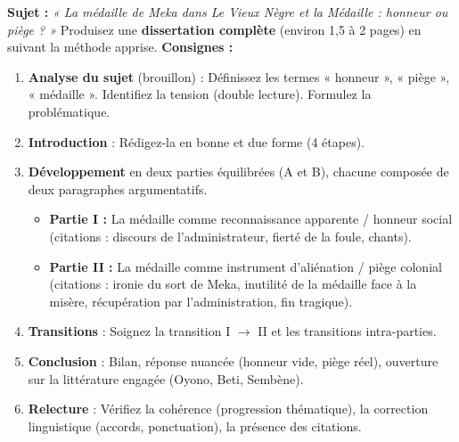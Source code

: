 \documentclass[11pt]{article}
\begin{document}
\begin{exercice}
\textbf{Sujet :} \emph{« La médaille de Meka dans \textit{Le Vieux Nègre et la Médaille} : honneur ou piège ? »}
Produisez une \textbf{dissertation complète} (environ 1,5 à 2 pages) en suivant la méthode apprise.
\textbf{Consignes :}
\begin{enumerate}
\item \textbf{Analyse du sujet} (brouillon) : Définissez les termes « honneur », « piège », « médaille ». Identifiez la tension (double lecture). Formulez la problématique.
\item \textbf{Introduction} : Rédigez-la en bonne et due forme (4 étapes).
\item \textbf{Développement} en deux parties équilibrées (A et B), chacune composée de deux paragraphes argumentatifs.
\begin{itemize}
\item \textbf{Partie I :} La médaille comme reconnaissance apparente / honneur social (citations : discours de l'administrateur, fierté de la foule, chants).
\item \textbf{Partie II :} La médaille comme instrument d'aliénation / piège colonial (citations : ironie du sort de Meka, inutilité de la médaille face à la misère, récupération par l'administration, fin tragique).
\end{itemize}
\item \textbf{Transitions} : Soignez la transition I $\to$ II et les transitions intra-parties.
\item \textbf{Conclusion} : Bilan, réponse nuancée (honneur vide, piège réel), ouverture sur la littérature engagée (Oyono, Beti, Sembène).
\item \textbf{Relecture} : Vérifiez la cohérence (progression thématique), la correction linguistique (accords, ponctuation), la présence des citations.
\end{enumerate}
\end{exercice}
\end{document}
